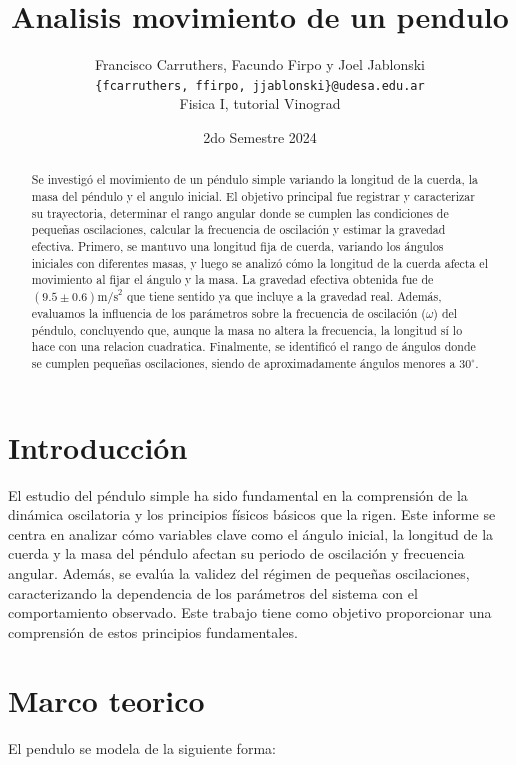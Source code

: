 \documentclass[12pt,a4]{article}
\title{Analisis movimiento de un pendulo}
\author{Francisco Carruthers, Facundo Firpo y Joel Jablonski\\ [2mm]
\small \texttt{\{fcarruthers, ffirpo, jjablonski\}@udesa.edu.ar}\\
\small Fisica I, tutorial Vinograd}
\date{2do Semestre 2024}
\begin{document}
\maketitle

\begin{abstract}
    Se investigó el movimiento de un péndulo simple variando la longitud de la cuerda, la masa del péndulo y el angulo inicial. 
    El objetivo principal fue registrar y caracterizar su trayectoria, determinar el rango angular donde se cumplen las condiciones de pequeñas oscilaciones, calcular la frecuencia de oscilación y estimar la gravedad efectiva. 
    Primero, se mantuvo una longitud fija de cuerda, variando los ángulos iniciales con diferentes masas, y luego se analizó cómo la longitud de la cuerda afecta el movimiento al fijar el ángulo y la masa. 
    La gravedad efectiva obtenida fue de $(9.5 \pm 0.6) \text{m/s}^2$ que tiene sentido ya que incluye a la gravedad real. 
    Además, evaluamos la influencia de los parámetros sobre la frecuencia de oscilación ($\omega$) del péndulo, concluyendo que, aunque la masa no altera la frecuencia, la longitud sí lo hace con una relacion cuadratica. 
    Finalmente, se identificó el rango de ángulos donde se cumplen pequeñas oscilaciones, siendo de aproximadamente ángulos menores a $30^\circ$.

\end{abstract}

\section{Introducción}

El estudio del péndulo simple ha sido fundamental en la comprensión de la dinámica oscilatoria y los principios físicos básicos que la rigen. 
Este informe se centra en analizar cómo variables clave como el ángulo inicial, la longitud de la cuerda y la masa del péndulo afectan su periodo de oscilación y frecuencia angular. 
Además, se evalúa la validez del régimen de pequeñas oscilaciones, caracterizando la dependencia de los parámetros del sistema con el comportamiento observado. 
Este trabajo tiene como objetivo proporcionar una comprensión de estos principios fundamentales.

\section{Marco teorico}

El pendulo se modela de la siguiente forma:
\end{document}
